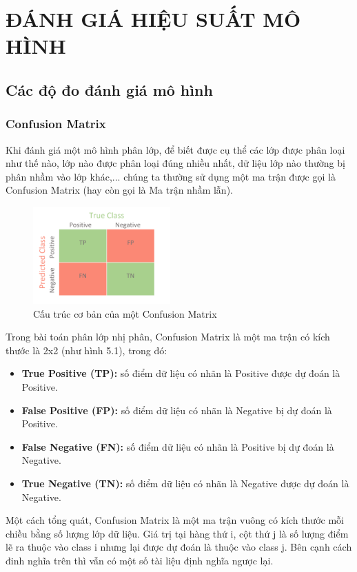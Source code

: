\documentclass[12pt,a4paper,oneside]{book}
\begin{document}
\chapter{ĐÁNH GIÁ HIỆU SUẤT MÔ HÌNH}
	\section{Các độ đo đánh giá mô hình}
	\subsection{Confusion Matrix}
		Khi đánh giá một mô hình phân lớp, để biết được cụ thể các lớp được phân loại như thế nào, lớp nào được phân loại đúng nhiều nhất, dữ liệu lớp nào thường bị phân nhầm vào lớp khác,... chúng ta thường sử dụng một ma trận được gọi là Confusion Matrix (hay còn gọi là Ma trận nhầm lẫn).
		
		\begin{figure}[H]
		\centering
		\includegraphics[width=0.47\textwidth]{confusionmatrix}
		\caption{Cấu trúc cơ bản của một Confusion Matrix}
		\end{figure}
		
		Trong bài toán phân lớp nhị phân, Confusion Matrix là một ma trận có kích thước là 2x2 (như hình 5.1), trong đó:
		\begin{itemize}
		\item \textbf{True Positive (TP):} số điểm dữ liệu có nhãn là Positive được dự đoán là Positive.
		\item \textbf{False Positive (FP):} số điểm dữ liệu có nhãn là Negative bị dự đoán là Positive.
		\item \textbf{False Negative (FN):} số điểm dữ liệu có nhãn là Positive bị dự đoán là Negative.
		\item \textbf{True Negative (TN):} số điểm dữ liệu có nhãn là Negative được dự đoán là Negative.
		\end{itemize}
		
		Một cách tổng quát, Confusion Matrix là một ma trận vuông có kích thước mỗi chiều bằng số lượng lớp dữ liệu. Giá trị tại hàng thứ i, cột thứ j là số lượng điểm lẽ ra thuộc vào class i nhưng lại được dự đoán là thuộc vào class j. Bên cạnh cách đinh nghĩa trên thì vẫn có một số tài liệu định nghĩa ngược lại.
		
\end{document}

